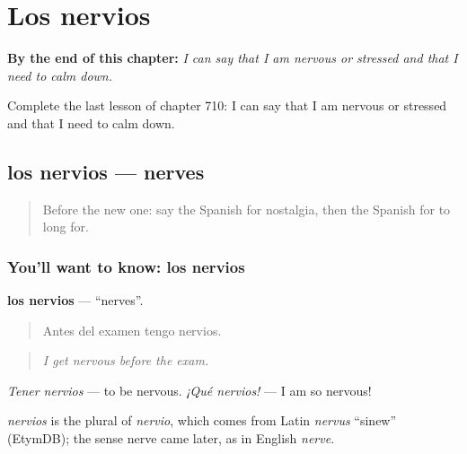 
\chapter{Los nervios}
\label{ch:es-los-nervios}

\begin{chapteropening}
\textbf{By the end of this chapter:} \emph{I can say that I am nervous or stressed and that I need to calm down.}

Complete the last lesson of chapter 710: I can say that I am nervous or stressed and that I need to calm down.
\end{chapteropening}

\section[los nervios]{los nervios — nerves}

\label{lesson:ES-C710-nervios}



\begin{quote}
Before the new one: say the Spanish for nostalgia, then the Spanish for to long for.
\end{quote}

\subsection*{You'll want to know: los nervios}
\textbf{los nervios} — \textquotedblleft{}nerves\textquotedblright{}.

\begin{quote}
Antes del examen tengo nervios.
\end{quote}

\begin{quote}
\emph{I get nervous before the exam.}
\end{quote}

\emph{Tener nervios} — to be nervous. \emph{¡Qué nervios!} — I am so nervous!

\begin{cousinweb}
\emph{nervios} is the plural of \emph{nervio}, which comes from Latin \emph{nervus} \textquotedblleft{}sinew\textquotedblright{} (EtymDB); the sense nerve came later, as in English \emph{nerve}.
\end{cousinweb}

